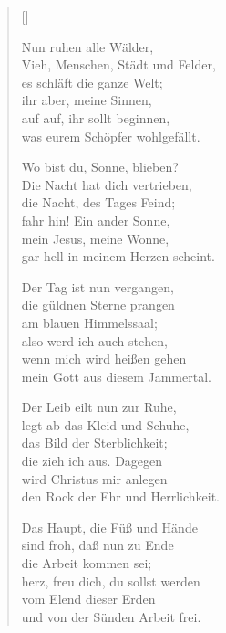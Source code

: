 \begin{multicols}{2}
\settowidth{\versewidth}{Wo bist du, Sonne, blieben?}
\begin{verse}[\versewidth]

 Nun ruhen alle Wälder,\\
Vieh, Menschen, Städt und Felder,\\
es schläft die ganze Welt;\\
ihr aber, meine Sinnen,\\
auf auf, ihr sollt beginnen,\\
was eurem Schöpfer wohlgefällt.

 Wo bist du, Sonne, blieben?\\
Die Nacht hat dich vertrieben,\\
die Nacht, des Tages Feind;\\
fahr hin! Ein ander Sonne,\\
mein Jesus, meine Wonne,\\
gar hell in meinem Herzen scheint.

 Der Tag ist nun vergangen,\\
die güldnen Sterne prangen\\
am blauen Himmelssaal;\\
also werd ich auch stehen,\\
wenn mich wird heißen gehen\\
mein Gott aus diesem Jammertal.

 Der Leib eilt nun zur Ruhe,\\
legt ab das Kleid und Schuhe,\\
das Bild der Sterblichkeit;\\
die zieh ich aus. Dagegen\\
wird Christus mir anlegen\\
den Rock der Ehr und Herrlichkeit.

 Das Haupt, die Füß und Hände\\
sind froh, daß nun zu Ende\\
die Arbeit kommen sei;\\
herz, freu dich, du sollst werden\\
vom Elend dieser Erden\\
und von der Sünden Arbeit frei.


\end{verse}
\end{multicols}
